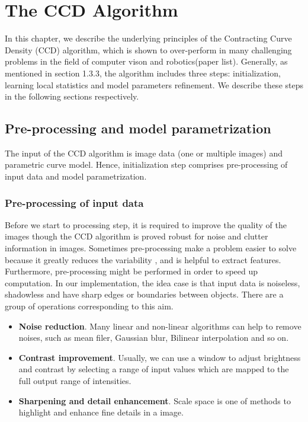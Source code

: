 \chapter{The CCD Algorithm}
\label{chapter:ccd}
In this chapter, we describe the underlying principles of the
Contracting Curve Density (CCD) algorithm, which is shown to
over-perform in many challenging problems in the field of computer
vison and robotics(paper list). Generally, as mentioned in section 1.3.3,
the algorithm includes three steps: initialization, learning
local statistics and model parameters refinement. We describe these
steps in the following sections respectively. 
\section{Pre-processing and model parametrization}
\label{sec:init}
The input of the CCD algorithm is image data (one or multiple images)
and parametric curve model. Hence, initialization step comprises
pre-processing of input data and model parametrization.
\subsection{Pre-processing of input data}
\label{sec:pid}

Before we start to processing step, it is required to
improve the quality of the images though the CCD
algorithm is proved robust for noise and clutter information in
images. Sometimes pre-processing make a problem easier to solve
because it greatly reduces the variability , and is helpful to extract
features. Furthermore, pre-processing might be performed in order to
speed up computation. In our implementation, the idea case is that
input data is noiseless, shadowless and have sharp edges or boundaries
between objects. There are a group of operations corresponding to this
aim.
\begin{itemize}
\item \textbf{Noise reduction}. Many linear and non-linear algorithms
  can help to remove noises, such as mean filer, Gaussian blur,
  Bilinear interpolation and so on.
\item \textbf{Contrast improvement}. Usually, we can use a window to
  adjust brightness and contrast by selecting a range of input values
  which are mapped to the full output range of intensities.
\item \textbf{Sharpening and detail enhancement}. Scale space is one
  of methods to highlight and enhance fine details in a image.
\end{itemize}

